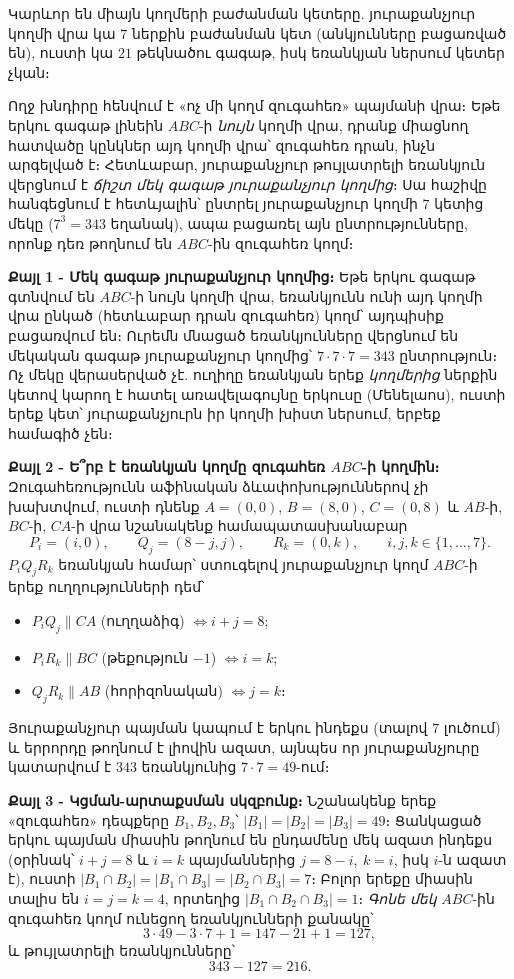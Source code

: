 \documentclass[11pt,a4paper]{article}
\begin{document}
\begin{ideabox}
Կարևոր են միայն կողմերի բաժանման կետերը. յուրաքանչյուր կողմի վրա կա $7$ ներքին բաժանման կետ
(անկյունները բացառված են), ուստի կա $21$ թեկնածու գագաթ, իսկ եռանկյան ներսում կետեր չկան։

Ողջ խնդիրը հենվում է «ոչ մի կողմ զուգահեռ» պայմանի վրա։ Եթե երկու գագաթ լինեին $ABC$-ի \emph{նույն}
կողմի վրա, դրանք միացնող հատվածը կընկներ այդ կողմի վրա՝ զուգահեռ դրան, ինչն արգելված է։ Հետևաբար,
յուրաքանչյուր թույլատրելի եռանկյուն վերցնում է \emph{ճիշտ մեկ գագաթ յուրաքանչյուր կողմից}։ Սա հաշիվը
հանգեցնում է հետևյալին՝ ընտրել յուրաքանչյուր կողմի $7$ կետից մեկը ($7^3=343$ եղանակ), ապա բացառել
այն ընտրությունները, որոնք դեռ թողնում են $ABC$-ին զուգահեռ կողմ։
\end{ideabox}

\textbf{Քայլ 1 - Մեկ գագաթ յուրաքանչյուր կողմից։}
Եթե երկու գագաթ գտնվում են $ABC$-ի նույն կողմի վրա, եռանկյունն ունի այդ կողմի վրա ընկած (հետևաբար
դրան զուգահեռ) կողմ՝ այդպիսիք բացառվում են։ Ուրեմն մնացած եռանկյունները վերցնում են մեկական գագաթ
յուրաքանչյուր կողմից՝ $7\cdot 7\cdot 7=343$ ընտրություն։ Ոչ մեկը վերասերված չէ. ուղիղը եռանկյան երեք \emph{կողմերից}
ներքին կետով կարող է հատել առավելագույնը երկուսը (Մենելաոս), ուստի երեք կետ՝ յուրաքանչյուրն իր
կողմի խիստ ներսում, երբեք համագիծ չեն։

\textbf{Քայլ 2 - Ե՞րբ է եռանկյան կողմը զուգահեռ $ABC$-ի կողմին։}
Զուգահեռությունն աֆինական ձևափոխություններով չի խախտվում, ուստի դնենք $A=(0,0)$, $B=(8,0)$,
$C=(0,8)$ և $AB$-ի, $BC$-ի, $CA$-ի վրա նշանակենք համապատասխանաբար
$$P_i=(i,0),\qquad Q_j=(8-j,j),\qquad R_k=(0,k),\qquad i,j,k\in\{1,\dots,7\}.$$
$P_iQ_jR_k$ եռանկյան համար՝ ստուգելով յուրաքանչյուր կողմ $ABC$-ի երեք ուղղությունների դեմ՝
\begin{itemize}[nosep]
  \item $P_iQ_j \parallel CA$ (ուղղաձիգ) $\iff i+j=8$;
  \item $P_iR_k \parallel BC$ (թեքություն $-1$) $\iff i=k$;
  \item $Q_jR_k \parallel AB$ (հորիզոնական) $\iff j=k$։
\end{itemize}
Յուրաքանչյուր պայման կապում է երկու ինդեքս (տալով $7$ լուծում) և երրորդը թողնում է լիովին ազատ,
այնպես որ յուրաքանչյուրը կատարվում է $343$ եռանկյունից $7\cdot 7=49$-ում։

\textbf{Քայլ 3 - Կցման-արտաքսման սկզբունք։}
Նշանակենք երեք «զուգահեռ» դեպքերը $B_1,B_2,B_3$՝ $|B_1|=|B_2|=|B_3|=49$։ Ցանկացած երկու պայման
միասին թողնում են ընդամենը մեկ ազատ ինդեքս (օրինակ՝ $i+j=8$ և $i=k$ պայմաններից $j=8-i,\ k=i$, իսկ
$i$-ն ազատ է), ուստի $|B_1\cap B_2|=|B_1\cap B_3|=|B_2\cap B_3|=7$։ Բոլոր երեքը միասին տալիս են
$i=j=k=4$, որտեղից $|B_1\cap B_2\cap B_3|=1$։ \emph{Գոնե մեկ} $ABC$-ին զուգահեռ կողմ ունեցող
եռանկյունների քանակը՝
$$3\cdot 49-3\cdot 7+1=147-21+1=127,$$
և թույլատրելի եռանկյունները՝
$$343-127=216.$$
\end{document}
